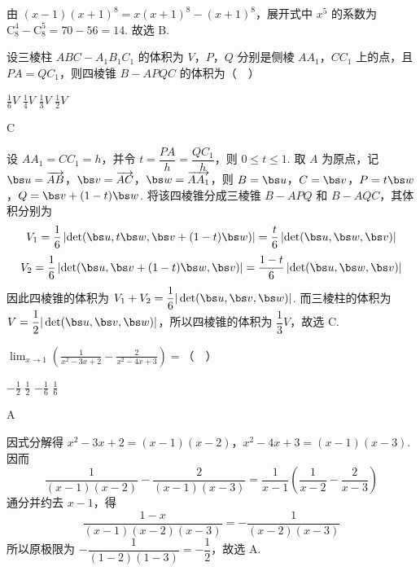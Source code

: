 \begin{solution}
由 \((x-1)(x+1)^8=x(x+1)^8-(x+1)^8\)，展开式中 \(x^5\) 的系数为 \(\mathrm C_8^4-\mathrm C_8^5=70-56=14\). 故选 B.
\end{solution}

\begin{problem}
设三棱柱 \(ABC - A_{1}B_{1}C_{1}\) 的体积为 \(V\)，\(P\)，\(Q\) 分别是侧棱 \(AA_{1}\)，\(CC_{1}\) 上的点，且 \(PA = QC_{1}\)，则四棱锥 \(B - APQC\) 的体积为（\(\quad\)）

\choices
    {\(\frac{1}{6} V\)}
    {\(\frac{1}{4} V\)}
    {\(\frac{1}{3} V\)}
    {\(\frac{1}{2} V\)}
\end{problem}

\begin{answer}
C
\end{answer}

\begin{solution}
设 \(AA_1=CC_1=h\)，并令 \(t=\dfrac{PA}{h}=\dfrac{QC_1}{h}\)，则 \(0\leqslant t\leqslant1\). 取 \(A\) 为原点，记 \(\bs u=\overrightarrow{AB}\)，\(\bs v=\overrightarrow{AC}\)，\(\bs w=\overrightarrow{AA_1}\)，则 \(B=\bs u\)，\(C=\bs v\)，\(P=t\bs w\)，\(Q=\bs v+(1-t)\bs w\). 将该四棱锥分成三棱锥 \(B-APQ\) 和 \(B-AQC\)，其体积分别为
\[
V_1=\frac{1}{6}\left|\det(\bs u,t\bs w,\bs v+(1-t)\bs w)\right|=\frac{t}{6}\left|\det(\bs u,\bs w,\bs v)\right|
\]
\[
V_2=\frac{1}{6}\left|\det(\bs u,\bs v+(1-t)\bs w,\bs v)\right|=\frac{1-t}{6}\left|\det(\bs u,\bs w,\bs v)\right|
\]
因此四棱锥的体积为 \(V_1+V_2=\dfrac{1}{6}|\det(\bs u,\bs v,\bs w)|\). 而三棱柱的体积为 \(V=\dfrac{1}{2}|\det(\bs u,\bs v,\bs w)|\)，所以四棱锥的体积为 \(\dfrac{1}{3}V\)，故选 C.
\end{solution}

\begin{problem}
\(\displaystyle\lim_{x\to 1}\left(\frac{1}{x^2 - 3x + 2} -\frac{2}{x^2 - 4x + 3}\right) =\)（\(\quad\)）

\choices
    {\(-\frac{1}{2}\)}
    {\(\frac{1}{2}\)}
    {\(-\frac{1}{6}\)}
    {\(\frac{1}{6}\)}
\end{problem}

\begin{answer}
A
\end{answer}

\begin{solution}
因式分解得 \(x^2-3x+2=(x-1)(x-2)\)，\(x^2-4x+3=(x-1)(x-3)\). 因而
\[
\frac{1}{(x-1)(x-2)}-\frac{2}{(x-1)(x-3)}
=\frac{1}{x-1}\left(\frac{1}{x-2}-\frac{2}{x-3}\right)
\]
通分并约去 \(x-1\)，得
\[
\frac{1-x}{(x-1)(x-2)(x-3)}
=-\frac{1}{(x-2)(x-3)}
\]
所以原极限为 \(-\dfrac{1}{(1-2)(1-3)}=-\dfrac{1}{2}\)，故选 A.
\end{solution}

